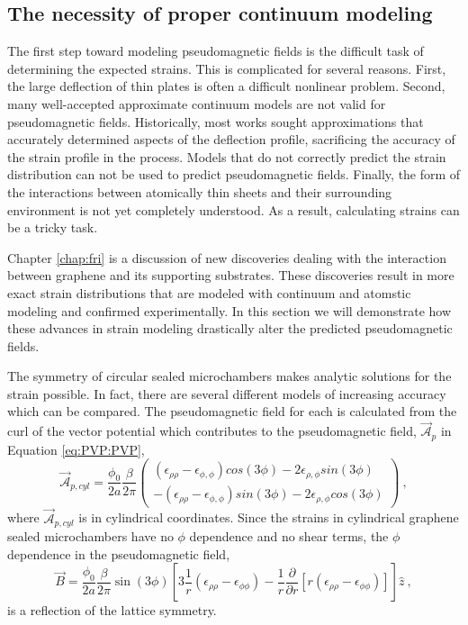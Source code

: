 \subsection{The necessity of proper continuum modeling\label{sec:PVP:GoodCont}}
The first step toward modeling pseudomagnetic fields is the difficult task of determining the expected strains.
This is complicated for several reasons.
First, the large deflection of thin plates is often a difficult nonlinear problem.
Second, many well-accepted approximate continuum models are not valid for pseudomagnetic fields.
Historically, most works sought approximations that accurately determined aspects of the deflection profile, sacrificing the accuracy of the strain profile in the process.
Models that do not correctly predict the strain distribution can not be used to predict pseudomagnetic fields.
Finally, the form of the interactions between atomically thin sheets and their surrounding environment is not yet completely understood.
As a result, calculating strains can be a tricky task.

Chapter \ref{chap:fri} is a discussion of new discoveries dealing with the interaction between graphene and its supporting substrates.
These discoveries result in more exact strain distributions that are modeled with continuum and atomstic modeling and confirmed experimentally.
In this section we will demonstrate how these advances in strain modeling drastically alter the predicted pseudomagnetic fields.

The symmetry of circular sealed microchambers makes analytic solutions for the strain possible.
In fact, there are several different models of increasing accuracy which can be compared.
The pseudomagnetic field for each is calculated from the curl of the vector potential which contributes to the pseudomagnetic field, $\vec{\mathcal{A}}_p$ in Equation \ref{eq:PVP:PVP}, 
\begin{equation*}
\vec{\mathcal{A}}_{p,cyl}=\frac{\phi_0}{2a} \frac{\beta}{2 \pi}
  \left( \begin{array}{c}
    (\epsilon_{\rho\rho}-\epsilon_{\phi,\phi}) cos(3\phi)-2 \epsilon_{\rho,\phi} sin (3 \phi) \\
    -(\epsilon_{\rho\rho}-\epsilon_{\phi,\phi}) sin(3\phi)-2 \epsilon_{\rho,\phi} cos (3 \phi)
  \end{array} \right) \ ,
\end{equation*}
where $\vec{\mathcal{A}}_{p,cyl}$ is in cylindrical coordinates.
Since the strains in cylindrical graphene sealed microchambers have no $\phi$ dependence and no shear terms, the $\phi$ dependence in the pseudomagnetic field,
\begin{equation*}
  \vec{B}=\frac{\phi_0}{2a}\frac{\beta}{2 \pi} \sin(3 \phi) \left[ 
  3 \frac{1}{r} (\epsilon_{\rho\rho}-\epsilon_{\phi \phi})-
  \frac{1}{r} \frac{\partial}{\partial r} \left[ r (\epsilon_{\rho\rho}-\epsilon_{\phi \phi}) \right]
  \right] \hat{z} \ ,
\end{equation*}
is a reflection of the lattice symmetry.

